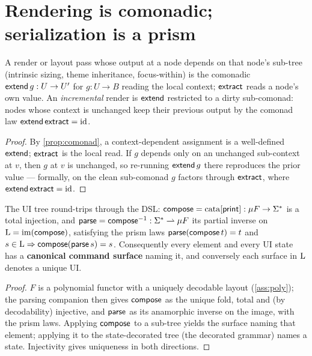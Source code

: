 \documentclass[../uxoxo-main]{subfiles}
\begin{document}
\section{Rendering is comonadic; serialization is a prism}\label{sec:render}
\begin{proposition}\label{prop:render}
A render or layout pass whose output at a node depends on that node's sub-tree
(intrinsic sizing, theme inheritance, focus-within) is the comonadic
$\mathsf{extend}\,g:U\to U'$ for $g:U\to B$ reading the local context; $\mathsf{extract}$ reads a
node's own value. An \emph{incremental} render is $\mathsf{extend}$ restricted to a dirty
sub-comonad: nodes whose context is unchanged keep their previous output by the
comonad law $\mathsf{extend}\,\mathsf{extract}=\mathrm{id}$.
\end{proposition}

\begin{proof}
By \cref{prop:comonad}, a context-dependent assignment is a well-defined
$\mathsf{extend}$; $\mathsf{extract}$ is the local read. If $g$ depends only on an unchanged
sub-context at $v$, then $g$ at $v$ is unchanged, so re-running $\mathsf{extend}\,g$ there
reproduces the prior value --- formally, on the clean sub-comonad $g$ factors
through $\mathsf{extract}$, where $\mathsf{extend}\,\mathsf{extract}=\mathrm{id}$.
\end{proof}

\begin{proposition}\label{prop:prism}
The UI tree round-trips through the DSL: $\mathsf{compose}=\mathrm{cata}[\mathsf{print}]:\mu
F\to\Sigma^{*}$ is a total injection, and $\mathsf{parse}=\mathsf{compose}^{-1}:\Sigma^{*}\rightharpoonup
\mu F$ its partial inverse on $\operatorname{L}=\operatorname{im}(\mathsf{compose})$, satisfying the prism laws
$\mathsf{parse}(\mathsf{compose}\,t)=t$ and $s\in\operatorname{L}\Rightarrow\mathsf{compose}(\mathsf{parse}\,s)=s$.
Consequently every element and every UI state has a \textbf{canonical command
surface} naming it, and conversely each surface in $\operatorname{L}$ denotes a unique UI.
\end{proposition}

\begin{proof}
$F$ is a polynomial  functor with a uniquely decodable layout
(\cref{ass:poly}); the parsing companion then gives $\mathsf{compose}$ as the unique fold,
total and (by decodability) injective, and $\mathsf{parse}$ as its anamorphic inverse on
the image, with the prism laws. Applying $\mathsf{compose}$ to a sub-tree yields the surface
naming that element; applying it to the state-decorated tree (the decorated grammar)
names a state. Injectivity gives uniqueness in both directions.
\end{proof}
\end{document}
